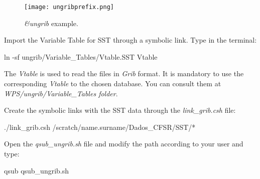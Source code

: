 \begin{figure}[H]
    \centering
    \texttt{[image: ungribprefix.png]}
    \caption{ \textit{\&ungrib} example.}
    \label{ungribprefix}
\end{figure}
\bigskip

\noindent Import the Variable Table for SST through a symbolic link. Type in the terminal:
\bigskip

\begin{bashcode}
ln -sf ungrib/Variable_Tables/Vtable.SST Vtable
\end{bashcode}
\bigskip

\begin{tcolorbox}[enhanced,
  grow to left by=0cm,%
  grow to right by=0cm,%
  enlarge top by=0cm,%
  enlarge bottom by=0cm,%
  tcbox raise base,
  boxrule=1.0pt,
  left=18mm,
  colframe=red!50!black,coltext=red!25!black,colback=red!10!white,
  overlay={\begin{tcbclipinterior}\fill[red!75!blue!50!white] (frame.south west)
    rectangle node[text=white,font=\sffamily\bfseries\footnotesize,rotate=0] {WARNING} ([xshift=18mm]frame.north west);\end{tcbclipinterior}}]
The \textit{Vtable} is used to read the files in \textit{Grib} format. It is mandatory to use the corresponding \textit{Vtable} to the chosen 
database. You can consult them at \textit{WPS/ungrib/Variable\_Tables folder}.
\end{tcolorbox}
\bigskip

\noindent Create the symbolic links with the SST data through the \textit{link\_grib.csh} file:
\bigskip

\begin{bashcode}
./link_grib.csh /scratch/name.surname/Dados_CFSR/SST/*
\end{bashcode}
\bigskip

\noindent Open the \textit{qsub\_ungrib.sh} file and modify the path according to your user and type:
\bigskip

\begin{bashcode}
qsub qsub_ungrib.sh
\end{bashcode}
\bigskip

